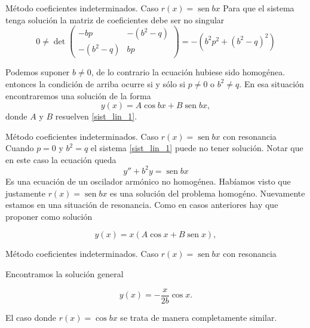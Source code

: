 \documentclass[handout,hyperref={colorlinks=true}]{beamer}
\DeclareMathOperator{\sen}{sen}
\begin{document}
 \begin{frame}{Método coeficientes indeterminados. Caso $r(x)=\sen bx$}
Para que el sistema tenga solución la matriz de coeficientes debe ser no singular
\[
  0\neq\det \begin{pmatrix}
              -bp & -(b^2-q)\\
              -(b^2-q) & bp
            \end{pmatrix} = -(b^2p^2+(b^2-q)^2)
\]

Podemos suponer $b\neq 0$, de lo contrario la ecuación hubiese sido homogénea. entonces la condición de arriba ocurre si y sólo si 
$p\neq 0$ o $b^2\neq q$. En esa situación encontraremos una solución de la forma
\[
 \boxed{y(x)=A\cos bx + B\sen bx},
\]
donde $A$ y $B$ resuelven \eqref{sist_lin_1}.
\end{frame}



  \begin{frame}{Método coeficientes indeterminados. Caso $r(x)=\sen bx$ con resonancia}\label{eq:forz_res}
Cuando $p=0$ y $b^2= q$ el sistema \eqref{sist_lin_1} puede no tener solución. Notar que en este caso la ecuación queda
\[
 y''+b^2y=\sen bx
\]
Es una ecuación de un oscilador armónico no homogénea. Habíamos visto que justamente $r(x)=\sen bx$ es una solución del problema homogéno. Nuevamente
estamos en una situación de resonancia.  Como en casos anteriores hay que proponer como solución

 \[y(x)=x\left(A\cos x+ B\sen x\right),\]
\end{frame}


   \begin{frame}{Método coeficientes indeterminados. Caso $r(x)=\sen bx$ con resonancia}
 \lstI
 
 Encontramos la solución general
 
  \[\boxed{y(x)=-\frac{x}{2b}\cos x}.\]
 
El caso donde $r(x)=\cos bx$ se trata de manera completamente similar.

\end{frame}
\end{document}
